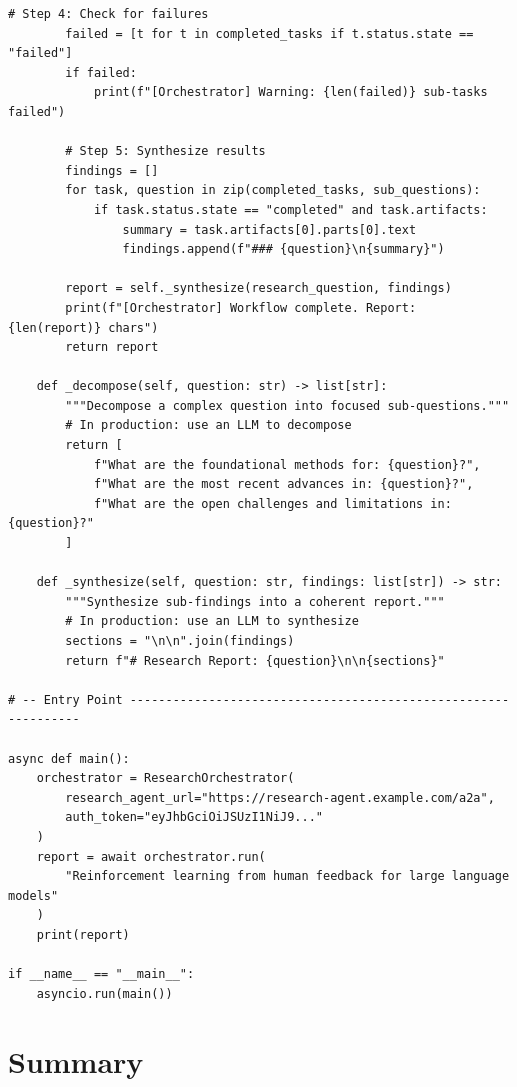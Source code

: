 \begin{lstlisting}[style=pythonstyle]
        # Step 4: Check for failures
        failed = [t for t in completed_tasks if t.status.state == "failed"]
        if failed:
            print(f"[Orchestrator] Warning: {len(failed)} sub-tasks failed")

        # Step 5: Synthesize results
        findings = []
        for task, question in zip(completed_tasks, sub_questions):
            if task.status.state == "completed" and task.artifacts:
                summary = task.artifacts[0].parts[0].text
                findings.append(f"### {question}\n{summary}")

        report = self._synthesize(research_question, findings)
        print(f"[Orchestrator] Workflow complete. Report: {len(report)} chars")
        return report

    def _decompose(self, question: str) -> list[str]:
        """Decompose a complex question into focused sub-questions."""
        # In production: use an LLM to decompose
        return [
            f"What are the foundational methods for: {question}?",
            f"What are the most recent advances in: {question}?",
            f"What are the open challenges and limitations in: {question}?"
        ]

    def _synthesize(self, question: str, findings: list[str]) -> str:
        """Synthesize sub-findings into a coherent report."""
        # In production: use an LLM to synthesize
        sections = "\n\n".join(findings)
        return f"# Research Report: {question}\n\n{sections}"

# -- Entry Point ---------------------------------------------------------------

async def main():
    orchestrator = ResearchOrchestrator(
        research_agent_url="https://research-agent.example.com/a2a",
        auth_token="eyJhbGciOiJSUzI1NiJ9..."
    )
    report = await orchestrator.run(
        "Reinforcement learning from human feedback for large language models"
    )
    print(report)

if __name__ == "__main__":
    asyncio.run(main())
\end{lstlisting}

\section{Summary}
\label{sec:a2a:summary}

